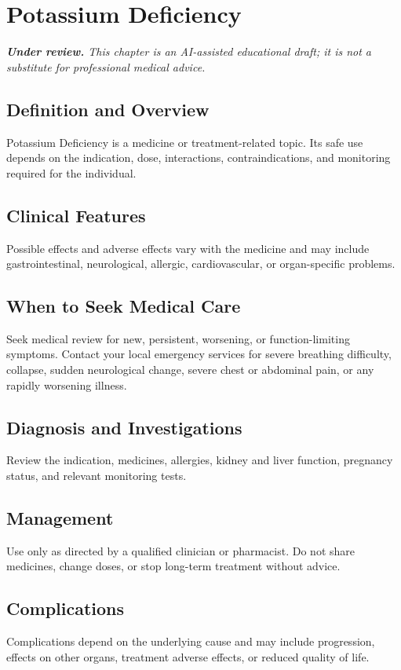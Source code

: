 \chapter{Potassium Deficiency}

\medskip
\noindent\textit{\textbf{Under review.} This chapter is an AI-assisted educational draft; it is not a substitute for professional medical advice.}

\section*{Definition and Overview}
Potassium Deficiency is a medicine or treatment-related topic. Its safe use depends on the indication, dose, interactions, contraindications, and monitoring required for the individual.

\section*{Clinical Features}
Possible effects and adverse effects vary with the medicine and may include gastrointestinal, neurological, allergic, cardiovascular, or organ-specific problems.

\section*{When to Seek Medical Care}
Seek medical review for new, persistent, worsening, or function-limiting symptoms. Contact your local emergency services for severe breathing difficulty, collapse, sudden neurological change, severe chest or abdominal pain, or any rapidly worsening illness.

\section*{Diagnosis and Investigations}
Review the indication, medicines, allergies, kidney and liver function, pregnancy status, and relevant monitoring tests.

\section*{Management}
Use only as directed by a qualified clinician or pharmacist. Do not share medicines, change doses, or stop long-term treatment without advice.

\section*{Complications}
Complications depend on the underlying cause and may include progression, effects on other organs, treatment adverse effects, or reduced quality of life.

